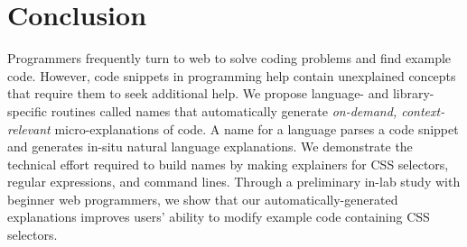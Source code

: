 \section{Conclusion}

Programmers frequently turn to web to solve coding problems and find example code.
However, code snippets in programming help contain unexplained concepts that require them to seek additional help.
We propose language- and library- specific routines called \Glspl{name} that automatically generate \emph{on-demand, context-relevant} micro-explanations of code.
A \gls{name} for a language parses a code snippet and generates in-situ natural language explanations.
We demonstrate the technical effort required to build \glspl{name} by making explainers for CSS selectors, regular expressions, and command lines.
Through a preliminary in-lab study with beginner web programmers, we show that our automatically-generated explanations improves users' ability to modify example code containing CSS selectors.
